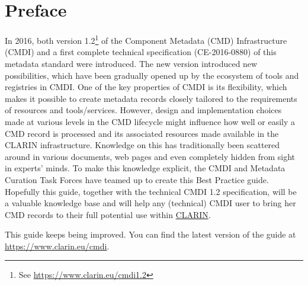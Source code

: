\section{Preface}
In 2016, both version 1.2\footnote{See \url{https://www.clarin.eu/cmdi1.2}} of
the  Component Metadata (CMD) Infrastructure (CMDI) and a first complete technical specification (CE-2016-0880)  of this metadata standard were introduced. The new version introduced new possibilities, which have been gradually opened up by the ecosystem of tools and registries in CMDI. One of the key properties of CMDI is its flexibility, which makes it possible to create metadata records closely tailored to the requirements of resources and tools/services. However, design and implementation choices made at various levels in the CMD lifecycle might influence how well or easily a CMD record is processed and its associated resources made available in the CLARIN infrastructure. Knowledge on this has traditionally been scattered around in various documents, web pages and even completely hidden from sight in experts' minds. To make this
knowledge explicit, the CMDI and Metadata Curation Task Forces have teamed up to create this Best Practice guide. Hopefully this guide, together with the technical CMDI 1.2 specification, will be a valuable knowledge base and will help any (technical) CMDI user to bring her CMD records to their full potential use within \href{https://www.clarin.eu}{CLARIN}.

This guide keeps being improved. You can find the latest version of the guide at \url{https://www.clarin.eu/cmdi}.

